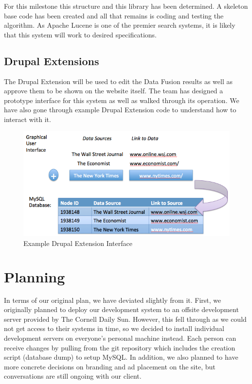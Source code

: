\documentclass[12pt]{article} %
\begin{document}
For this milestone this structure and this library has been determined. A skeleton base code has been created and all that remains is coding and testing the algorithm. As Apache Lucene is one of the premier search systems, it is likely that this system will work to desired specifications.

\subsection{Drupal Extensions}

The Drupal Extension will be used to edit the Data Fusion results as well as approve them to be shown on the website itself. The team has designed a prototype interface for this system as well as walked through its operation. We have also gone through example Drupal Extension code to understand how to interact with it.
       
\begin{figure}[htbp]
\begin{center}
\includegraphics[width=6in]{images/drupal_ext_interface}
\caption{Example Drupal Extension Interface}
\end{center}
\end{figure}

\section{Planning}

In terms of our original plan, we have deviated slightly from it. First, we originally planned to deploy our development system to an offsite development server provided by The Cornell Daily Sun. However, this fell through as we could not get access to their systems in time, so we decided to install individual development servers on everyone’s personal machine instead. Each person can receive changes by pulling from the git repository which includes the creation script (database dump) to setup MySQL. In addition, we also planned to have more concrete decisions on branding and ad placement on the site, but conversations are still ongoing with our client.
\end{document}
